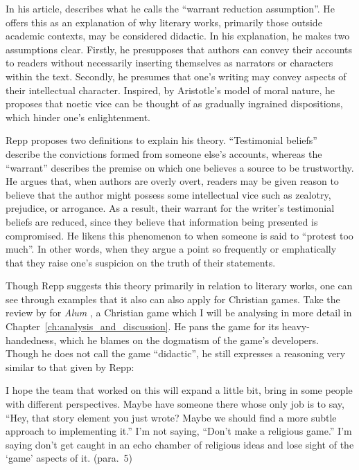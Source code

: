 In his article, \textcite{repp_whats_2012} describes what he calls the ``warrant reduction assumption''. He offers this as an explanation of why literary works, primarily those outside academic contexts, may be considered didactic. In his explanation, he makes two assumptions clear. Firstly, he presupposes that authors can convey their accounts to readers without necessarily inserting themselves as narrators or characters within the text. Secondly, he presumes that one's writing may convey aspects of their intellectual character. Inspired, by Aristotle's model of moral nature, he proposes that noetic vice can be thought of as gradually ingrained dispositions, which hinder one's enlightenment.

Repp proposes two definitions to explain his theory. ``Testimonial beliefs'' describe the convictions formed from someone else's accounts, whereas the ``warrant'' describes the premise on which one believes a source to be trustworthy. He argues that, when authors are overly overt, readers may be given reason to believe that the author might possess some intellectual vice such as zealotry, prejudice, or arrogance. As a result, their warrant for the writer's testimonial beliefs are reduced, since they believe that information being presented is compromised. He likens this phenomenon to when someone is said to ``protest too much''. In other words, when they argue a point so frequently or emphatically that they raise one's suspicion on the truth of their statements.

Though Repp suggests this theory primarily in relation to literary works, one can see through examples that it also can also apply for Christian games. Take the review by \textcite{arkane_review_2015} for \textit{Alum} \parencite{orsie_alum_2006}, a Christian game which I will be analysing in more detail in Chapter~\ref{ch:analysis_and_discussion}. He pans the game for its heavy-handedness, which he blames on the dogmatism of the game's developers. Though he does not call the game ``didactic'', he still expresses a reasoning very similar to that given by Repp:

\begin{displayquote}
 I hope the team that worked on this will expand a little bit, bring in some people with different perspectives. Maybe have someone there whose only job is to say, ``Hey, that story element you just wrote? Maybe we should find a more subtle approach to implementing it.'' I'm not saying, ``Don't make a religious game.'' I'm saying don't get caught in an echo chamber of religious ideas and lose sight of the `game' aspects of it. (para.~5)
\end{displayquote}

